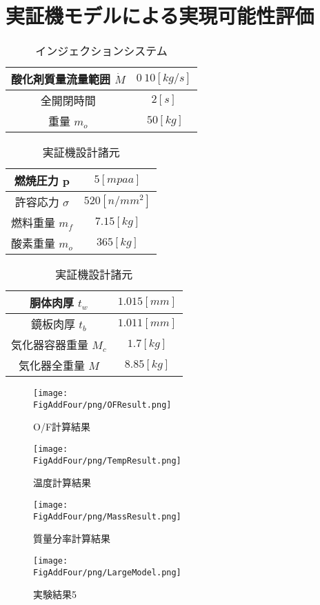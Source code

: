 \chapter{実証機モデルによる実現可能性評価}
\newcommand{\FigAddFour}{./src/Chapter4/Figure}



\begin{table}[htb]
\begin{center}
\caption{インジェクションシステム}
\begin{tabular}{|c|c|} \hline
酸化剤質量流量範囲 $\dot{M}$ 			&$0~10[kg/s]$		\\ \hline
全開閉時間 			&$2[s]$		\\ \hline
重量 $m_o$		 &$~50[kg]$  \\ \hline
\end{tabular}
\label{tab:C4LOXbase}
\end{center}
\end{table}

\begin{table}[htb]
\begin{center}
\caption{実証機設計諸元}
\begin{tabular}{|c|c|} \hline
燃焼圧力 p 			&$5[mpaa]$		\\ \hline
許容応力 $\sigma$	&$520[n/mm^2]$	\\ \hline
燃料重量 $m_f$		 &$7.15[kg]$ 	 \\ \hline
酸素重量 $m_o$		 &$365[kg]$  \\ \hline
\end{tabular}
\label{tab:realmodel}
\end{center}
\end{table}

\begin{table}[htb]
\begin{center}
\caption{実証機設計諸元}
\begin{tabular}{|c|c|} \hline
胴体肉厚 $t_w$			&$1.015[mm]$		\\ \hline
鏡板肉厚 $t_b$			&$1.011[mm]$	\\ \hline
気化器容器重量 $M_c$	&$1.7[kg]$ 	 \\ \hline
気化器全重量 $M$		&$8.85[kg]$  \\ \hline
\end{tabular}
\label{tab:RealResult}
\end{center}
\end{table}

\begin{figure}
\centering
\texttt{[image: \\FigAddFour/png/OFResult.png]}
\caption{O/F計算結果}
\label{fig:C4OF}
\end{figure}
\begin{figure}
\centering
\texttt{[image: \\FigAddFour/png/TempResult.png]}
\caption{温度計算結果}
\label{fig:C4Temp}
\end{figure}
\begin{figure}
\centering
\texttt{[image: \\FigAddFour/png/MassResult.png]}
\caption{質量分率計算結果}
\label{fig:C4Mass}
\end{figure}

\begin{figure}
\centering
\texttt{[image: \\FigAddFour/png/LargeModel.png]}
\caption{実験結果5}
\label{fig:LargeModel}
\end{figure}

